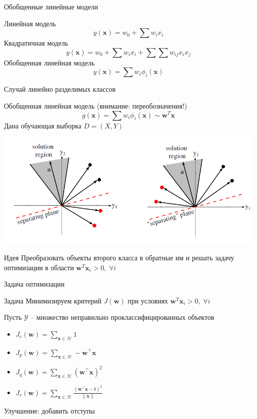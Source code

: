 \documentclass[aspectratio=169]{beamer}
\begin{document}
\begin{frame}{Обобщенные линейные модели}

Линейная модель
\[
y(\mathbf{x}) = w_0 + \sum w_i x_i
\]
Квадратичная модель
\[
y(\mathbf{x}) = w_0 + \sum w_i x_i + \sum \sum w_{ij} x_i x_j
\]
Обобщенная линейная модель
\[
y(\mathbf{x}) = \sum w_i \phi_i(\mathbf{x})
\]

\end{frame}

\begin{frame}{Случай линейно разделимых классов}

Обобщенная линейная модель (внимание: переобозначения!)
\[
g(\mathbf{x}) = \sum w_i \phi_i(\mathbf{x}) \sim \mathbf{w}^T \mathbf{x}
\]
Дана обучающая выборка $D = (X, Y)$

\begin{center}
\includegraphics[scale=0.35]{images/optimzation.png}
\end{center}

\begin{exampleblock}{Идея}
Преобразовать объекты второго класса в обратные им и решать задачу оптимизации в области $\mathbf{w}^T \mathbf{x}_i > 0, \; \forall i$
\end{exampleblock}

\end{frame}

\begin{frame}{Задача оптимизации}

\begin{block}{Задача}
Минимизируем критерий $J(\mathbf{w})$ при условиях $\mathbf{w}^T \mathbf{x}_i > 0, \; \forall i$
\end{block}

Пусть $\mathcal{Y}$ -- множество неправильно проклассифицированных объектов
\begin{itemize}
\item $J_e(\mathbf{w}) = \sum_{\mathbf{x} \in \mathcal{H}} 1$ 
\item $J_p(\mathbf{w}) = \sum_{\mathbf{x} \in \mathcal{H}} - \mathbf{w}^\top \mathbf{x}$ 
\item $J_q(\mathbf{w}) = \sum_{\mathbf{x} \in \mathcal{H}} (\mathbf{w}^\top \mathbf{x})^2$
\item $J_r(\mathbf{w}) = \sum_{\mathbf{x} \in \mathcal{H}} \frac{(\mathbf{w}^\top \mathbf{x} - b)^2}{\|\mathbf{x}\|}$
\end{itemize}
Улучшение: добавить отступы

\end{frame}
\end{document}
